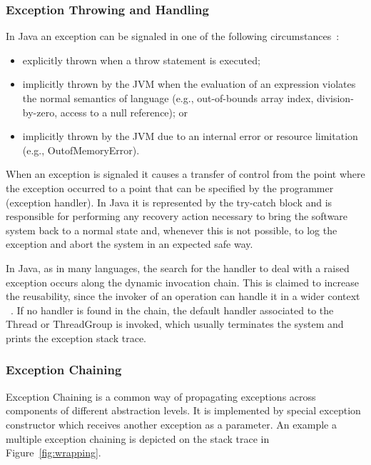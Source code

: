 \documentclass[conference]{IEEEtran}
\begin{document}
\subsubsection{Exception Throwing and Handling}

In Java an exception can be signaled in one of the following circumstances~\cite{gosling2000java}:

\begin{itemize}
\item  explicitly thrown when a throw statement is executed;
\item  implicitly thrown by the JVM when the evaluation of an expression violates the normal semantics of language (e.g., out-of-bounds array index, division-by-zero, access to a null reference); or 
\item implicitly thrown by the JVM due to an internal error or resource limitation (e.g., OutofMemoryError).
\end{itemize}
When an exception is signaled it causes a transfer of control from the point where the exception occurred to a point that can be specified by the programmer (exception handler). In Java it is represented by the try-catch block and is responsible for performing any recovery action necessary to bring the software system back to a normal state and, whenever this is not possible, to log the exception and abort the system in an expected safe way. 

In Java, as in many languages, the search for the handler to deal with a raised exception occurs along the dynamic invocation chain. This is claimed to increase the reusability, since the invoker of an operation can handle it in a wider context ~\cite{goodenough1975exception}. If no handler is found in the chain, the default handler associated to the Thread or ThreadGroup is invoked, which usually terminates the system and prints the exception stack trace.

\subsubsection{Exception Chaining}
Exception Chaining is a common way of propagating exceptions across components of different abstraction levels. It is implemented by special exception constructor which receives another exception as a parameter. An example a multiple exception chaining is depicted on the stack trace in Figure~\ref{fig:wrapping}. 
\end{document}
